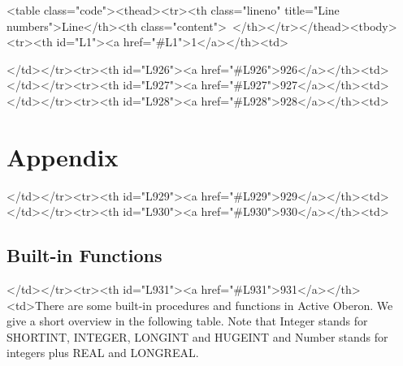 <table class="code"><thead><tr><th class="lineno" title="Line numbers">Line</th><th class="content"> </th></tr></thead><tbody><tr><th id="L1"><a href="#L1">1</a></th><td>\documentclass[a4paper,11pt]{article}
\begin{document}
</td></tr><tr><th id="L926"><a href="#L926">926</a></th><td>
</td></tr><tr><th id="L927"><a href="#L927">927</a></th><td>\appendix
</td></tr><tr><th id="L928"><a href="#L928">928</a></th><td>\section{Appendix}
</td></tr><tr><th id="L929"><a href="#L929">929</a></th><td>
</td></tr><tr><th id="L930"><a href="#L930">930</a></th><td>\subsection{Built-in Functions}
</td></tr><tr><th id="L931"><a href="#L931">931</a></th><td>There are some built-in procedures and functions in Active Oberon. We give a short overview in the following table. Note that Integer stands for SHORTINT, INTEGER, LONGINT and HUGEINT and Number stands for integers plus REAL and LONGREAL.
\end{document}
